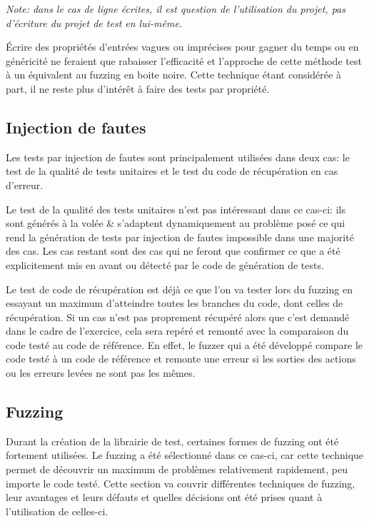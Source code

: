 \documentclass[a4paper]{report}
\begin{document}
\textit{Note: dans le cas de ligne écrites, il est question de l'utilisation du projet, pas d'écriture du projet de test en lui-même.}

Écrire des propriétés d'entrées vagues ou imprécises pour gagner du temps ou en généricité ne feraient que rabaisser l'efficacité et l'approche de cette méthode test à un équivalent au fuzzing en boite noire.
Cette technique étant considérée à part, il ne reste plus d'intérêt à faire des tests par propriété. 

\subsection{Injection de fautes}

Les tests par injection de fautes sont principalement utilisées dans deux cas: le test de la qualité de tests unitaires et le test du code de récupération en cas d'erreur.

Le test de la qualité des tests unitaires n'est pas intéressant dans ce cas-ci: ils sont générés à la volée \& s'adaptent dynamiquement au problème posé ce qui rend la génération de tests par injection de fautes impossible dans une majorité des cas.
Les cas restant sont des cas qui ne feront que confirmer ce que a été explicitement mis en avant ou détecté par le code de génération de tests.

Le test de code de récupération est déjà ce que l'on va tester lors du fuzzing en essayant un maximum d'atteindre toutes les branches du code, dont celles de récupération.
Si un cas n'est pas proprement récupéré alors que c'est demandé dans le cadre de l'exercice, cela sera repéré et remonté avec la comparaison du code testé au code de référence.
En effet, le fuzzer qui a été développé compare le code testé à un code de référence et remonte une erreur si les sorties des actions ou les erreurs levées ne sont pas les mêmes.

\subsection{Fuzzing}

Durant la création de la librairie de test, certaines formes de fuzzing ont été fortement utilisées.
Le fuzzing a été sélectionné dans ce cas-ci, car cette technique permet de découvrir un maximum de problèmes relativement rapidement, peu importe le code testé.
Cette section va couvrir différentes techniques de fuzzing, leur avantages et leurs défauts et quelles décisions ont été prises quant à l'utilisation de celles-ci.
\end{document}
